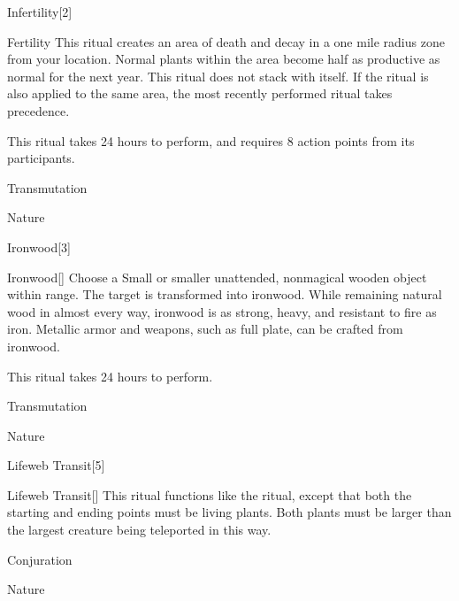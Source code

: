 \begin{spellsection}{Infertility}[2]


\begin{ability}{Fertility}
This ritual creates an area of death and decay in a one mile radius zone from your location.
Normal plants within the area become half as productive as normal for the next year.
This ritual does not stack with itself.
If the  ritual is also applied to the same area, the most recently performed ritual takes precedence.

This ritual takes 24 hours to perform, and requires 8 action points from its participants.
\end{ability}




 Transmutation

 Nature
\end{spellsection}


\begin{spellsection}{Ironwood}[3]


\begin{ability}{Ironwood}[]
Choose a Small or smaller unattended, nonmagical wooden object within \rngclose range.
The target is transformed into ironwood.
While remaining natural wood in almost every way, ironwood is as strong, heavy, and resistant to fire as iron.
Metallic armor and weapons, such as full plate, can be crafted from ironwood.

This ritual takes 24 hours to perform.
\end{ability}




 Transmutation

 Nature
\end{spellsection}


\begin{spellsection}{Lifeweb Transit}[5]


\begin{ability}{Lifeweb Transit}[]
This ritual functions like the  ritual, except that both the starting and ending points must be living plants.
Both plants must be larger than the largest creature being teleported in this way.
\end{ability}




 Conjuration

 Nature
\end{spellsection}


